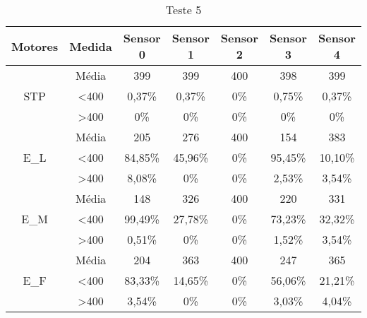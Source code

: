 \begin{table}[]
\centering
\caption{Teste 5}
\label{teste_5}
\begin{tabular}{|c|c|ccccc|}
\hline
\textbf{Motores}                & \textbf{Medida}  & \textbf{Sensor 0} & \textbf{Sensor 1} & \textbf{Sensor 2} & \textbf{Sensor 3} & \textbf{Sensor 4} \\ \hline
\multirow{3}{*}{STP}            & Média            & 399               & 399               & 400               & 398               & 399               \\
                                & \textless 400    & 0,37\%            & 0,37\%            & 0\%            & 0,75\%            & 0,37\%            \\
                                & \textgreater 400 & 0\%            & 0\%            & 0\%            & 0\%            & 0\%            \\ \hline
\multirow{3}{*}{E\_L}           & Média            & 205               & 276               & 400               & 154               & 383               \\
                                & \textless 400    & 84,85\%           & 45,96\%           & 0\%            & 95,45\%           & 10,10\%           \\
                                & \textgreater 400 & 8,08\%            & 0\%            & 0\%            & 2,53\%            & 3,54\%            \\ \hline
\multirow{3}{*}{E\_M}           & Média            & 148               & 326               & 400               & 220               & 331               \\
                                & \textless 400    & 99,49\%           & 27,78\%           & 0\%            & 73,23\%           & 32,32\%           \\
                                & \textgreater 400 & 0,51\%            & 0\%            & 0\%            & 1,52\%            & 3,54\%            \\ \hline
\multirow{3}{*}{E\_F}           & Média            & 204               & 363               & 400               & 247               & 365               \\
                                & \textless 400    & 83,33\%           & 14,65\%           & 0\%            & 56,06\%           & 21,21\%           \\
                                & \textgreater 400 & 3,54\%            & 0\%            & 0\%            & 3,03\%            & 4,04\%            \\ \hline

\end{tabular}
\end{table}

